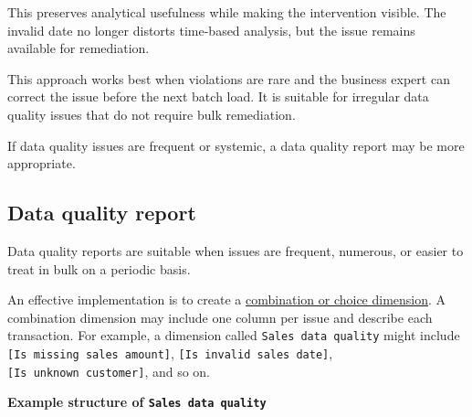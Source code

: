 \documentclass[10pt,openany,10pt]{book}
\begin{document}
This preserves analytical usefulness while making the intervention
visible. The invalid date no longer distorts time-based analysis, but
the issue remains available for remediation.

This approach works best when violations are rare and the business
expert can correct the issue before the next batch load. It is suitable
for irregular data quality issues that do not require bulk remediation.

If data quality issues are frequent or systemic, a data quality report
may be more appropriate.

\subsection{Data quality report}\label{data-quality-report}

Data quality reports are suitable when issues are frequent, numerous, or
easier to treat in bulk on a periodic basis.

An effective implementation is to create a
\hyperref[docs-presenting-insights-dimensional-modelling-for-ux]{combination
or choice dimension}. A combination dimension may include one column per
issue and describe each transaction. For example, a dimension called
\texttt{\textquotesingle{}Sales\ data\ quality\textquotesingle{}} might
include \texttt{{[}Is\ missing\ sales\ amount{]}},
\texttt{{[}Is\ invalid\ sales\ date{]}},
\texttt{{[}Is\ unknown\ customer{]}}, and so on.

\textbf{Example structure of
\texttt{\textquotesingle{}Sales\ data\ quality\textquotesingle{}}}
\end{document}
